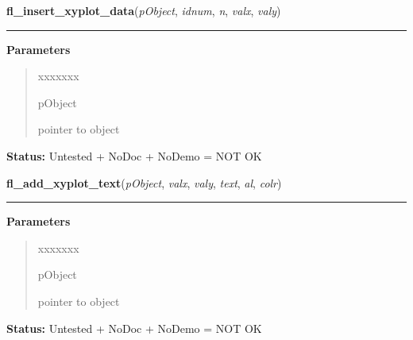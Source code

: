 \hspace{.8\funcindent}\begin{boxedminipage}{\funcwidth}

    \raggedright \textbf{fl\_insert\_xyplot\_data}(\textit{pObject}, \textit{idnum}, \textit{n}, \textit{valx}, \textit{valy})

    \vspace{-1.5ex}

    \rule{\textwidth}{0.5\fboxrule}
\setlength{\parskip}{2ex}
\setlength{\parskip}{1ex}
      \textbf{Parameters}
      \vspace{-1ex}

      \begin{quote}
        \begin{Ventry}{xxxxxxx}

          \item[pObject]

          pointer to object

        \end{Ventry}

      \end{quote}

\textbf{Status:} Untested + NoDoc + NoDemo = NOT OK



    \end{boxedminipage}

    \label{xformslib:library:fl_add_xyplot_text}

    \vspace{0.5ex}

\hspace{.8\funcindent}\begin{boxedminipage}{\funcwidth}

    \raggedright \textbf{fl\_add\_xyplot\_text}(\textit{pObject}, \textit{valx}, \textit{valy}, \textit{text}, \textit{al}, \textit{colr})

    \vspace{-1.5ex}

    \rule{\textwidth}{0.5\fboxrule}
\setlength{\parskip}{2ex}
\setlength{\parskip}{1ex}
      \textbf{Parameters}
      \vspace{-1ex}

      \begin{quote}
        \begin{Ventry}{xxxxxxx}

          \item[pObject]

          pointer to object

        \end{Ventry}

      \end{quote}

\textbf{Status:} Untested + NoDoc + NoDemo = NOT OK



    \end{boxedminipage}

